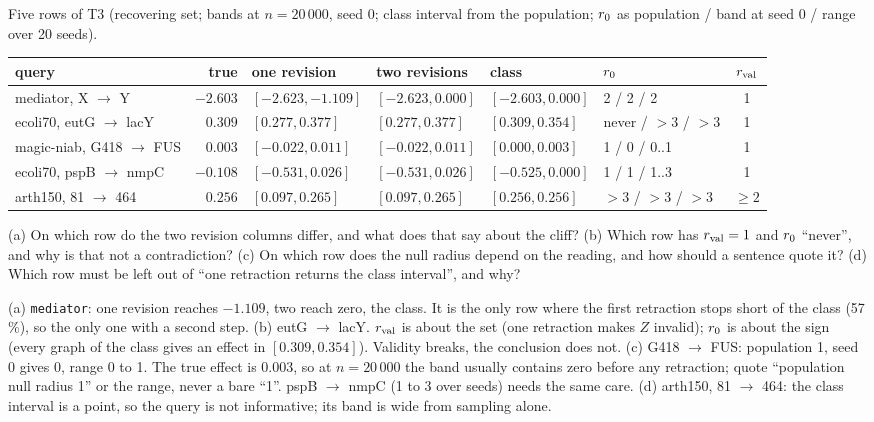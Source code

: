 \begin{exercicio}[metodo=table-reading,conceito=nulidade]
Five rows of T3 (recovering set; bands at $n = 20\,000$, seed 0; class interval from the population;
$r_{0}$ as population / band at seed 0 / range over 20 seeds).

\smallskip
{\footnotesize\setlength{\tabcolsep}{3pt}
\begin{tabular}{@{}lrllllc@{}}
\toprule
query & true & one revision & two revisions & class & $r_{0}$ & $r_{\mathrm{val}}$ \\
\midrule
mediator, X $\to$ Y & $-2.603$ & $[-2.623, -1.109]$ & $[-2.623, 0.000]$ & $[-2.603, 0.000]$ & 2 / 2 / 2 & 1 \\
ecoli70, eutG $\to$ lacY & $0.309$ & $[0.277, 0.377]$ & $[0.277, 0.377]$ & $[0.309, 0.354]$ & never / $>$3 / $>$3 & 1 \\
magic-niab, G418 $\to$ FUS & $0.003$ & $[-0.022, 0.011]$ & $[-0.022, 0.011]$ & $[0.000, 0.003]$ & 1 / 0 / 0..1 & 1 \\
ecoli70, pspB $\to$ nmpC & $-0.108$ & $[-0.531, 0.026]$ & $[-0.531, 0.026]$ & $[-0.525, 0.000]$ & 1 / 1 / 1..3 & 1 \\
arth150, 81 $\to$ 464 & $0.256$ & $[0.097, 0.265]$ & $[0.097, 0.265]$ & $[0.256, 0.256]$ & $>$3 / $>$3 / $>$3 & $\ge 2$ \\
\bottomrule
\end{tabular}}

\smallskip
(a) On which row do the two revision columns differ, and what does that say about the cliff? (b) Which
row has $r_{\mathrm{val}} = 1$ and $r_{0}$ ``never'', and why is that not a contradiction? (c) On which row does the
null radius depend on the reading, and how should a sentence quote it? (d) Which row must be left out of
``one retraction returns the class interval'', and why?
\end{exercicio}
\begin{solucao}
(a) \texttt{mediator}: one revision reaches $-1.109$, two reach zero, the class. It is the only row
where the first retraction stops short of the class (57\,\%), so the only one with a second step. (b)
eutG $\to$ lacY. $r_{\mathrm{val}}$ is about the set (one retraction makes $Z$ invalid); $r_{0}$ is about the sign
(every graph of the class gives an effect in $[0.309, 0.354]$). Validity breaks, the conclusion does
not. (c) G418 $\to$ FUS: population 1, seed 0 gives 0, range 0 to 1. The true effect is 0.003, so at
$n = 20\,000$ the band usually contains zero before any retraction; quote ``population null radius 1''
or the range, never a bare ``1''. pspB $\to$ nmpC (1 to 3 over seeds) needs the same care. (d) arth150,
81 $\to$ 464: the class interval is a point, so the query is not informative; its band is wide from
sampling alone.
\end{solucao}

